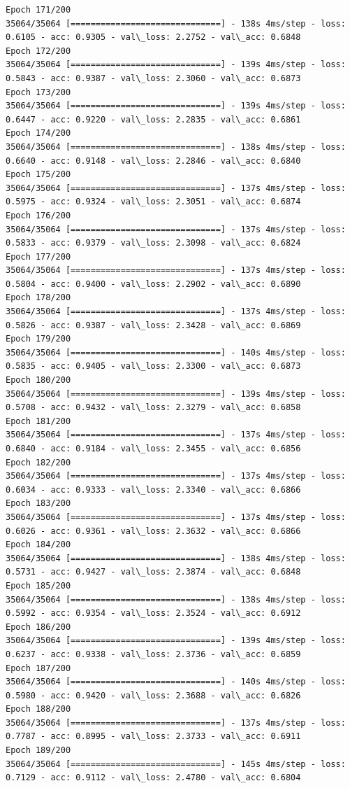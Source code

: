 \documentclass[11pt]{article}
\begin{document}
\begin{Verbatim}[commandchars=\\\{\}]
Epoch 171/200
35064/35064 [==============================] - 138s 4ms/step - loss: 0.6105 - acc: 0.9305 - val\_loss: 2.2752 - val\_acc: 0.6848
Epoch 172/200
35064/35064 [==============================] - 139s 4ms/step - loss: 0.5843 - acc: 0.9387 - val\_loss: 2.3060 - val\_acc: 0.6873
Epoch 173/200
35064/35064 [==============================] - 139s 4ms/step - loss: 0.6447 - acc: 0.9220 - val\_loss: 2.2835 - val\_acc: 0.6861
Epoch 174/200
35064/35064 [==============================] - 138s 4ms/step - loss: 0.6640 - acc: 0.9148 - val\_loss: 2.2846 - val\_acc: 0.6840
Epoch 175/200
35064/35064 [==============================] - 137s 4ms/step - loss: 0.5975 - acc: 0.9324 - val\_loss: 2.3051 - val\_acc: 0.6874
Epoch 176/200
35064/35064 [==============================] - 137s 4ms/step - loss: 0.5833 - acc: 0.9379 - val\_loss: 2.3098 - val\_acc: 0.6824
Epoch 177/200
35064/35064 [==============================] - 137s 4ms/step - loss: 0.5804 - acc: 0.9400 - val\_loss: 2.2902 - val\_acc: 0.6890
Epoch 178/200
35064/35064 [==============================] - 137s 4ms/step - loss: 0.5826 - acc: 0.9387 - val\_loss: 2.3428 - val\_acc: 0.6869
Epoch 179/200
35064/35064 [==============================] - 140s 4ms/step - loss: 0.5835 - acc: 0.9405 - val\_loss: 2.3300 - val\_acc: 0.6873
Epoch 180/200
35064/35064 [==============================] - 139s 4ms/step - loss: 0.5708 - acc: 0.9432 - val\_loss: 2.3279 - val\_acc: 0.6858
Epoch 181/200
35064/35064 [==============================] - 137s 4ms/step - loss: 0.6840 - acc: 0.9184 - val\_loss: 2.3455 - val\_acc: 0.6856
Epoch 182/200
35064/35064 [==============================] - 137s 4ms/step - loss: 0.6034 - acc: 0.9333 - val\_loss: 2.3340 - val\_acc: 0.6866
Epoch 183/200
35064/35064 [==============================] - 137s 4ms/step - loss: 0.6026 - acc: 0.9361 - val\_loss: 2.3632 - val\_acc: 0.6866
Epoch 184/200
35064/35064 [==============================] - 138s 4ms/step - loss: 0.5731 - acc: 0.9427 - val\_loss: 2.3874 - val\_acc: 0.6848
Epoch 185/200
35064/35064 [==============================] - 138s 4ms/step - loss: 0.5992 - acc: 0.9354 - val\_loss: 2.3524 - val\_acc: 0.6912
Epoch 186/200
35064/35064 [==============================] - 139s 4ms/step - loss: 0.6237 - acc: 0.9338 - val\_loss: 2.3736 - val\_acc: 0.6859
Epoch 187/200
35064/35064 [==============================] - 140s 4ms/step - loss: 0.5980 - acc: 0.9420 - val\_loss: 2.3688 - val\_acc: 0.6826
Epoch 188/200
35064/35064 [==============================] - 137s 4ms/step - loss: 0.7787 - acc: 0.8995 - val\_loss: 2.3733 - val\_acc: 0.6911
Epoch 189/200
35064/35064 [==============================] - 145s 4ms/step - loss: 0.7129 - acc: 0.9112 - val\_loss: 2.4780 - val\_acc: 0.6804

\end{Verbatim}
\end{document}
